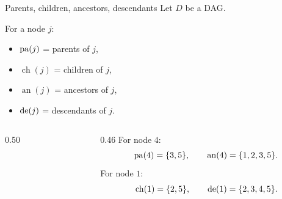 \documentclass[dvipsnames,aspectratio=169,handout]{beamer}
\newcommand{\ch}{\operatorname{ch}}
\newcommand{\an}{\operatorname{an}}
\begin{document}
\begin{frame}{Parents, children, ancestors, descendants}
Let $D$ be a DAG.

\begin{block}{}
For a node $j$:\\[2mm]
\begin{minipage}{7cm}
	\begin{itemize}
    \item $\operatorname{pa}(j)$ = parents of $j$,
    \item $\ch(j)$ = children of $j$,
\end{itemize}
\end{minipage}\begin{minipage}{7cm}
	\begin{itemize}
    \item $\an(j)$ = ancestors of $j$,
    \item $\operatorname{de}(j)$ = descendants of $j$.
\end{itemize}
\end{minipage}
\end{block}

\begin{columns}[T]
\begin{column}{0.50\textwidth}
\begin{center}
\end{center}
\end{column}
\begin{column}{0.46\textwidth}
For node $4$:
\[
\pa(4)=\{3,5\},
\qquad
\an(4)=\{1,2,3,5\}.
\]
For node $1$:
\[
\ch(1)=\{2,5\},
\qquad
\de(1)=\{2,3,4,5\}.
\]
\end{column}
\end{columns}
\end{frame}
\end{document}
